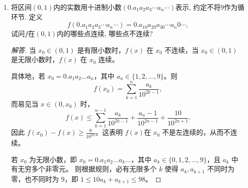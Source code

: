 \begin{2b}
\begin{enumerate}
\begin{proof}
只考虑这样的情形：$\forall\,\delta>0$，
$\left\{k \in \Z_+|x_0 \le x_{k}<x_0+\delta\right\}$非空
（否则，若存在$\delta>0$使得
$\left\{k \in \Z_+|x_0 \le x_{k}<x_0+\delta\right\}$是空集，
易见$\sum\limits_{x_0 \le x_{k}<x_0+\delta}\frac{1}{2^k}<\varepsilon$平凡地成立）.

令$\delta_{0}=1$，$m_{0}=\min\left\{k \in \Z_+|x_0 \le x_{k}<x_0+1\right\}$，
对正整数$n\ge 1$，

定义$\delta_{n}=x_{m_{n-1}}-x_0$，
$m_{n}=\min\left\{k \in \Z_+|x_0 \le x_{k}<x_0+\delta_{n}\right\}$。
易见$x_0<x_{m_{n}}<x_{m_{n-1}}$，$m_{n}>m_{n-1}$，$\forall\,n\ge 1$。
从而$\left\{m_{n}\right\}_{n=0}^{\infty}$是严格单调增的无上界的正整数列，
$\delta_{n}>0$，$\forall\,n\ge 1$.

$\forall\,\varepsilon>0$，取$\left\{m_{n}\right\}_{n=0}^{\infty}$中
充分大的一个正整数$m_{s}$ s.t. $$\frac{1}{2^{m_{s}-1}}<\varepsilon,$$

令$\delta=\delta_{s}$，注意到
$m_{s}=\min\left\{k \in \Z_+|x_0 \le x_{k}<x_0+\delta_{s}\right\}$，从而
$$\sum\limits_{x_0 \le x_{k}<x_0+\delta_{s}}\frac{1}{2^k}\le \sum\limits_{k=m_{s}}^{\infty}\frac{1}{2^k}=\frac{1}{2^{m_{s}-1}}<\varepsilon.$$

$f$在$\left\{x_{k}\right\}_{k=1}^{\infty}$的任一点处不连续，以及
$\left\{x_{k}\right\}_{k=1}^{\infty}$在$\mathbb{R}$中稠密时$f$严格单增的证明是容易的.

\end{proof}
\item 将区间\((0,1)\)内的实数用十进制小数\((0.a_1a_2a_3\cdots a_n\cdots)\)表示, 约定不将\(9\)作为循环节. 定义\[f(0.a_1a_2a_3\cdots a_n\cdots)=0.a_10a_20a_30\cdots a_n0\cdots,\]试问\(f\)在\((0,1)\)内的哪些点连续, 哪些点不连续?
\begin{proof}[解答]
当 $x_0 \in(0,1)$ 是有限小数时，$f(x)$ 在 $x_0$ 不连续，当 $x_0 \in(0,1)$ 是无限小数时，$f(x)$ 在 $x_0$ 连续。

具体地，若 $x_0=0.a_1 a_2 \ldots a_n$，其中 $a_n \in\{1,2, \ldots, 9\}$。则
\[f(x_0)=\sum_{k=1}^n \frac{a_k}{10^{2k-1}},\]
而易见当 $x \in(0, x_0)$ 时，
\[f(x) \leqslant \sum_{k=1}^{n-1} \frac{a_k}{10^{2k-1}}+\frac{a_n-1}{10^{2n-1}}+\frac{10}{10^{2n+1}}.\]
因此 $f(x_0)-f(x) \geqslant \frac{9}{10^{2 n}}$。这表明 $f(x)$在 $x_0$ 不是左连续的，从而不连续。

若 $x_0$ 为无限小数，即 $x_0=0.a_1 a_2 \ldots a_k \ldots$，其中 $a_k \in\{0,1,2, \ldots, 9\}$，且 $a_k$ 中有无穷多个非零元。
则根据规则，必有无限多个 $k$ 使得 $a_k, a_{k+1}$ 不同时为零，也不同时为 $9$，即 $1 \leqslant 10 a_k+a_{k+1} \leqslant 98$。


\end{proof}
\end{enumerate}
\end{2b}
